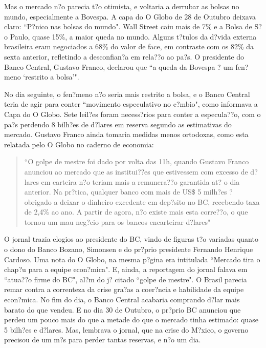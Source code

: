 \documentclass{article}
\begin{document}
Mas o mercado n?o parecia t?o otimista, e voltaria a derrubar as bolsas no mundo, especialmente a Bovespa. A capa do O Globo de 28 de Outubro deixava claro: ``P?nico nas bolsas do mundo". Wall Street caiu mais de 7\% e a Bolsa de S?o Paulo, quase 15\%, a maior queda no mundo. Alguns t?tulos da d?vida externa brasileira eram negociados a 68\% do valor de face, em contraste com os 82\% da sexta anterior, refletindo a desconfian?a em rela??o ao pa?s. O presidente do Banco Central, Gustavo Franco, declarou que ``a queda da Bovespa ? um fen?meno `restrito a bolsa'".

No dia seguinte, o fen?meno n?o seria mais restrito a bolsa, e o Banco Central teria de agir para  conter ``movimento especulativo no c?mbio", como informava a Capa do O Globo. Sete leil?es foram necess?rios para conter a especula??o, com o pa?s perdendo 8 bilh?es de d?lares em reserva segundo as estimativas do mercado. Gustavo Franco ainda tomaria medidas menos ortodoxas, como esta relatada pelo O Globo no caderno de economia:

\begin{quote}
``O golpe de mestre foi dado por volta das 11h, quando Gustavo Franco anunciou ao mercado que as institui??es que estivessem com excesso de d?lares em carteira n?o teriam mais a remunera??o garantida at? o dia anterior. Na pr?tica, qualquer banco com mais de US\$ 5 milh?es ? obrigado a deixar o dinheiro excedente em dep?sito no BC, recebendo taxa de 2,4\% ao ano. A partir de agora, n?o existe mais esta corre??o, o que tornou um mau neg?cio para os bancos encarteirar d?lares"

\end{quote}     

O jornal trazia elogios ao presidente do BC, vindo de figuras t?o variadas quanto o dono do Banco Bozano, Simonsen e do pr?prio presidente Fernando Henrique Cardoso. Uma nota do O Globo, na mesma p?gina era intitulada ``Mercado tira o chap?u para a equipe econ?mica". E, ainda, a reportagem do jornal falava em ``atua??o firme do BC", al?m do j? citado ``golpe de mestre". O Brasil parecia remar contra a correnteza da crise gra?as a coer?ncia e habilidade da equipe econ?mica. No fim do dia, o Banco Central acabaria comprando d?lar mais barato do que vendeu. E no dia 30 de Outubro, o pr?prio BC anunciou que perdeu um pouco mais do que a metade do que o mercado tinha estimado: quase 5 bilh?es e d?lares. Mas, lembrava o jornal, que na crise do M?xico, o governo precisou de um m?s para perder tantas reservas, e n?o um dia. 
\end{document}
